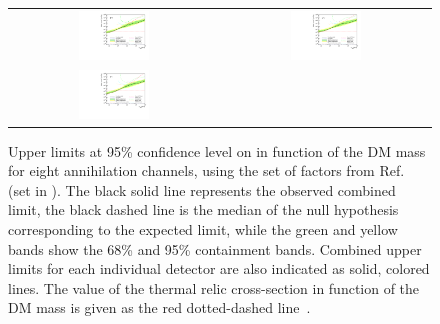 \begin{figure}[h!]
{\begin{tabular}{cc}
    \includegraphics[width=0.35\textwidth]{figures/glory_duck/limits/Glory_Duck_Annihilation_ee_Geringer-Sameth_Combination_bands.pdf} &
    \includegraphics[width=0.35\textwidth]{figures/glory_duck/limits/Glory_Duck_Annihilation_mumu_Geringer-Sameth_Combination_bands.pdf} \\
    \includegraphics[width=0.35\textwidth]{figures/glory_duck/limits/Glory_Duck_Annihilation_tautau_Geringer-Sameth_Combination_bands.pdf} &
    \end{tabular}
    }
    \caption{Upper limits at 95\% confidence level on \sv in function of the DM mass for eight annihilation channels, using the set of \J factors from Ref.~\cite{Geringer-Sameth:2014yza} (\GS set in ). The black solid line represents the observed combined limit, the black dashed line is the median of the null hypothesis corresponding to the expected limit, while the green and yellow bands show the 68\% and 95\% containment bands. Combined upper limits for each individual detector are also indicated as solid, colored lines.
    The value of the thermal relic cross-section in function of the DM mass is given as the red dotted-dashed line~\cite{Bertone_2005}.}
\label{fig:limits-geringer-sameth}
\end{figure}


